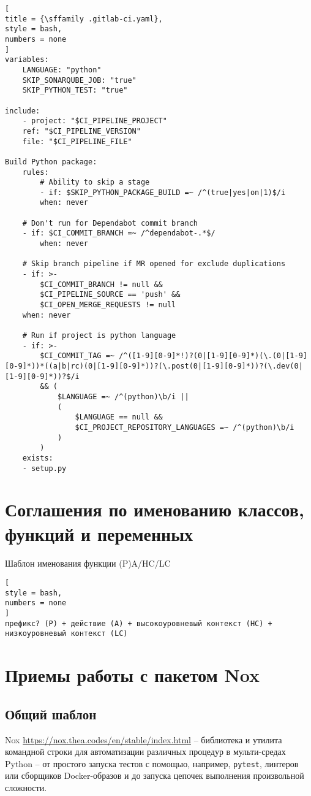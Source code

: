 \documentclass[%
	11pt,
	a4paper,
	utf8,
		]{article}
\begin{document}
\begin{lstlisting}[
title = {\sffamily .gitlab-ci.yaml},
style = bash,
numbers = none
]
variables:
	LANGUAGE: "python"
	SKIP_SONARQUBE_JOB: "true"
	SKIP_PYTHON_TEST: "true"

include:
	- project: "$CI_PIPELINE_PROJECT"   
	ref: "$CI_PIPELINE_VERSION"       
	file: "$CI_PIPELINE_FILE"         

Build Python package:
	rules:
		# Ability to skip a stage
		- if: $SKIP_PYTHON_PACKAGE_BUILD =~ /^(true|yes|on|1)$/i
		when: never

	# Don't run for Dependabot commit branch
	- if: $CI_COMMIT_BRANCH =~ /^dependabot-.*$/
		when: never

	# Skip branch pipeline if MR opened for exclude duplications
	- if: >-
		$CI_COMMIT_BRANCH != null &&
		$CI_PIPELINE_SOURCE == 'push' &&
		$CI_OPEN_MERGE_REQUESTS != null
	when: never

	# Run if project is python language
	- if: >-
		$CI_COMMIT_TAG =~ /^([1-9][0-9]*!)?(0|[1-9][0-9]*)(\.(0|[1-9][0-9]*))*((a|b|rc)(0|[1-9][0-9]*))?(\.post(0|[1-9][0-9]*))?(\.dev(0|[1-9][0-9]*))?$/i
		&& (
			$LANGUAGE =~ /^(python)\b/i ||
			(
				$LANGUAGE == null &&
				$CI_PROJECT_REPOSITORY_LANGUAGES =~ /^(python)\b/i
			)
		)
	exists:
	- setup.py
\end{lstlisting}


\section{Соглашения по именованию классов, функций и переменных}

Шаблон именования функции (P)A/HC/LC
\begin{lstlisting}[
style = bash,
numbers = none
]
префикс? (P) + действие (A) + высокоуровневый контекст (HC) + низкоуровневый контекст (LC)
\end{lstlisting}

\section{Приемы работы с пакетом Nox}

\subsection{Общий шаблон}

Nox \url{https://nox.thea.codes/en/stable/index.html} -- библиотека и утилита командной строки для автоматизации различных процедур в мульти-средах Python -- от простого запуска тестов с помощью, например, \verb|pytest|, линтеров или сборщиков Docker-образов и до запуска цепочек выполнения произвольной сложности.
\end{document}

